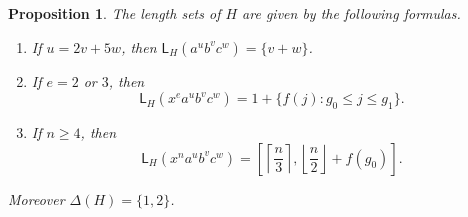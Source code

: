 \documentclass[11pt]{article}
\newtheorem{proposition}[theorem]{Proposition}
\theoremstyle{definition}
\newcommand{\LL}{\mathsf L}
\begin{document}
\begin{proposition}\label{prop:lengths}
The length sets of $H$ are given by the following formulas.
\begin{enumerate}
\item If $u=2v+5w$, then $\LL_H(a^ub^vc^w)=\{v+w\}$.
\item If $e=2$ or $3$, then
\begin{equation}\label{eq:first-layer}
 \LL_H(x^ea^ub^vc^w)=1+\{f(j):g_0\leq j\leq g_1\}.
\end{equation}
\item If $n\geq4$, then
\begin{equation}\label{eq:high-layers}
 \LL_H(x^na^ub^vc^w)
 =\left[\left\lceil\frac n3\right\rceil,
         \left\lfloor\frac n2\right\rfloor+f(g_0)\right].
\end{equation}
\end{enumerate}
Moreover $\Delta(H)=\{1,2\}$.
\end{proposition}
\end{document}

